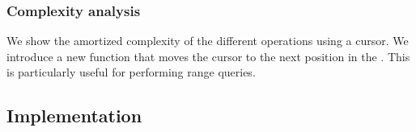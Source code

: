 \subsubsection{Complexity analysis}
We show the amortized complexity of the different operations using a cursor. We introduce a new function that moves the cursor to the next position in the \btree.
This is particularly useful for performing range queries.

\subsection{Implementation}


\beforeinsert
\afterinsert
